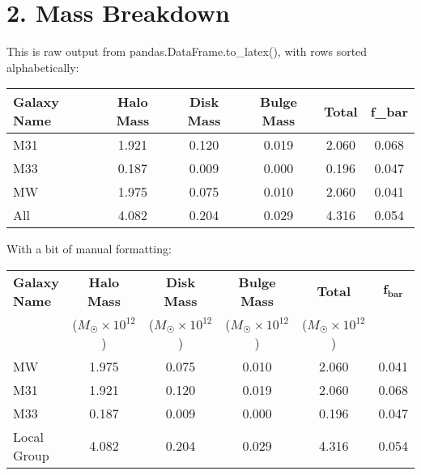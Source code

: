

\setlength{\parskip}{0.2em}
\setlength{\skip\footins}{20pt}

\newcommand{\hmwkClass}{ASTR 400B}
\newcommand{\hmwkTitle}{Homework 3}
\newcommand{\hmwkDueDate}{Feb 6, 2020}



	
\maketitle

\section*{2. Mass Breakdown}

This is raw output from pandas.DataFrame.to\_latex(), with rows sorted alphabetically:\\

\begin{tabular}{lccccc}
	\toprule
	Galaxy Name &  Halo Mass &  Disk Mass &  Bulge Mass &  Total &  f\_bar \\
	\midrule
	M31 &      1.921 &      0.120 &       0.019 &  2.060 &  0.068 \\
	M33 &      0.187 &      0.009 &       0.000 &  0.196 &  0.047 \\
	MW &      1.975 &      0.075 &       0.010 &  2.060 &  0.041 \\
	All &      4.082 &      0.204 &       0.029 &  4.316 &  0.054 \\
	\bottomrule
\end{tabular}\vspace{5mm}

With a bit of manual formatting:\\

\begin{tabular}{lccccc}
	\toprule
	\textbf{Galaxy Name} &  \textbf{Halo Mass}  &  \textbf{Disk Mass} &  \textbf{Bulge Mass} &  \textbf{Total} &  $\mathbf{f_{bar}}$ \\
	 & ($M_\Sun \times 10^{12}$) & ($M_\Sun \times 10^{12}$) & ($M_\Sun \times 10^{12}$) & ($M_\Sun \times 10^{12}$) & \\
	\midrule
	MW &  1.975 &  0.075 &   0.010 &  2.060 &  0.041 \\
	M31 &  1.921 &  0.120 &   0.019 &  2.060 &  0.068 \\
	M33 &  0.187 &  0.009 &   0.000 &  0.196 &  0.047 \\
	\midrule
	Local Group &  4.082 &  0.204 &   0.029 &  4.316 &  0.054 \\
	\bottomrule
\end{tabular}

